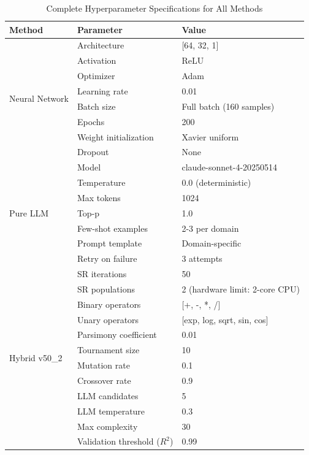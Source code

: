 \documentclass[twoside,11pt]{article}
\begin{document}
\begin{table}[H]
\centering
\caption{Complete Hyperparameter Specifications for All Methods}
\label{tab:hyperparameters_complete}
\small
\begin{tabular}{lll}
\toprule
\textbf{Method} & \textbf{Parameter} & \textbf{Value} \\
\midrule
\multirow{8}{*}{Neural Network} 
& Architecture & [64, 32, 1] \\
& Activation & ReLU \\
& Optimizer & Adam \\
& Learning rate & 0.01 \\
& Batch size & Full batch (160 samples) \\
& Epochs & 200 \\
& Weight initialization & Xavier uniform \\
& Dropout & None \\
\midrule
\multirow{7}{*}{Pure LLM}
& Model & claude-sonnet-4-20250514 \\
& Temperature & 0.0 (deterministic) \\
& Max tokens & 1024 \\
& Top-p & 1.0 \\
& Few-shot examples & 2-3 per domain \\
& Prompt template & Domain-specific \\
& Retry on failure & 3 attempts \\
\midrule
\multirow{12}{*}{Hybrid v50\_2}
& SR iterations & 50 \\
& SR populations & 2 (hardware limit: 2-core CPU) \\
& Binary operators & [+, -, *, /] \\
& Unary operators & [exp, log, sqrt, sin, cos] \\
& Parsimony coefficient & 0.01 \\
& Tournament size & 10 \\
& Mutation rate & 0.1 \\
& Crossover rate & 0.9 \\
& LLM candidates & 5 \\
& LLM temperature & 0.3 \\
& Max complexity & 30 \\
& Validation threshold ($R^2$) & 0.99 \\
\bottomrule
\end{tabular}
\end{table}

\end{document}
